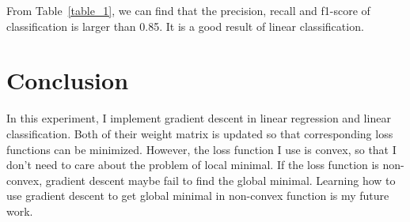 \documentclass[journal, a4paper]{IEEEtran}
\begin{document}
From Table~\ref{table_1}, we can find that the precision, recall and f1-score of classification is larger than 0.85. It is a good result of linear classification.

\section{Conclusion}
In this experiment, I implement gradient descent in linear regression and linear classification. Both of their weight matrix is updated so that corresponding loss functions can be minimized. However, the loss function I use is convex, so that I don't need to care about the problem of local minimal. If the loss function is non-convex, gradient descent maybe fail to find the global minimal. Learning how to use gradient descent to get global minimal in non-convex function is my future work.

\end{document}
